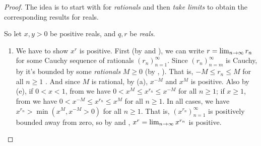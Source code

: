 \begin{proof}
The idea is to start with  for \emph{rationals} and then \emph{take limits} to obtain the corresponding results for reals.

So let \(x, y > 0\) be positive reals, and \(q, r\) be \emph{reals}.
\begin{enumerate}
\item
    We have to show \(x^r\) is positive.
    First (by  and ), we can write \(r = \lim_{n \to \infty} r_n\) for some Cauchy sequence of rationals \((r_n)_{n = 1}^{\infty}\).
    Since \((r_n)_{n = m}^{\infty}\) is Cauchy, by  it's bounded by some \emph{rationals} \(M \ge 0\) (by , ).
    That is, \(-M \le r_n \le M\) for all \(n \ge 1\) .
    And since \(M\) is rational, by (a), \(x^{-M}\) and \(x^{M}\) is positive.
    Also by (e), if \(0 < x < 1\), from  we have \(0 < x^M \le x^{r_n} \le x^{-M}\) for all \(n \ge 1\);
    if \(x \ge 1\), from  we have \(0 < x^{-M} \le x^{r_n} \le x^M\) for all \(n \ge 1\).
    In all cases, we have \(x^{r_n} > \min(x^M, x^{-M} > 0)\) for all \(n \ge 1\).
    That is, \((x^{r_n})_{n = 1}^{\infty}\) is positively bounded away from zero, so by  and , \(x^r = \lim_{n \to \infty} x^{r_n}\) is positive.


\end{enumerate}
\end{proof}
